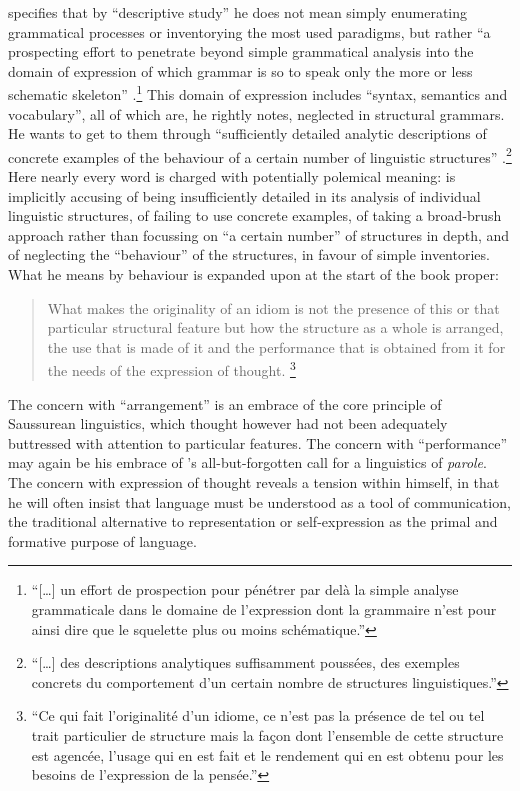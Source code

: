 \documentclass[output=paper]{langscibook}
\begin{document}
{\Sauvageot} specifies that by ``descriptive study'' he does not mean simply enumerating grammatical processes or inventorying the most used paradigms, but rather ``a prospecting effort to penetrate beyond simple grammatical analysis into the domain of expression of which grammar is so to speak only the more or less schematic skeleton'' \citep[7]{Sauvageot1946}.\footnote{``[…] un effort de prospection pour pénétrer par delà la simple analyse grammaticale dans le domaine de l'expression dont la grammaire n'est pour ainsi dire que le squelette plus ou moins schématique.''} This domain of expression includes ``syntax, semantics and vocabulary'', all of which are, he rightly notes, neglected in structural grammars. He wants to get to them through ``sufficiently detailed analytic descriptions of concrete examples of the behaviour of a certain number of linguistic structures'' \citep[7]{Sauvageot1946}.\footnote{``[…] des descriptions analytiques suffisamment poussées, des exemples concrets du comportement d'un certain nombre de structures linguistiques.''} Here nearly every word is charged with potentially polemical meaning: {\Sauvageot} is implicitly accusing  of being insufficiently detailed in its analysis of individual linguistic structures, of failing to use concrete examples, of taking a broad-brush approach rather than focussing on ``a certain number'' of structures in depth, and of neglecting the ``behaviour'' of the structures, in favour of simple inventories. What he means by behaviour is expanded upon at the start of the book proper: 

\largerpage[1]\begin{quotation}
What makes the originality of an idiom is not the presence of this or that particular structural feature but how the structure as a whole is arranged, the use that is made of it and the performance that is obtained from it for the needs of the expression of thought. \citep[13]{Sauvageot1946}\footnote{``Ce qui fait l'originalité d'un idiome, ce n'est pas la présence de tel ou tel trait particulier de structure mais la façon dont l'ensemble de cette structure est agencée, l'usage qui en est fait et le rendement qui en est obtenu pour les besoins de l'expression de la pensée.''} 
\end{quotation}

The concern with ``arrangement'' is an embrace of the core principle of Saussurean linguistics, which {\Sauvageot} thought however had not been adequately buttressed with attention to particular features. The concern with ``performance'' may again be his embrace of {\Saussure}'s all-but-forgotten call for a linguistics of \emph{parole}. The concern with expression of thought reveals a tension within {\Sauvageot} himself, in that he will often insist that language must be understood as a tool of communication, the traditional alternative to representation or self-expression as the primal and formative purpose of language.
\end{document}
